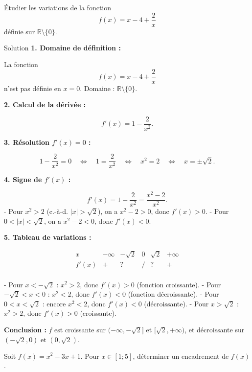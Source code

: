 \documentclass[a4paper,12pt]{article}
\begin{document}
\begin{exercice}[title=Exercice 14 $\quad \star \quad$ {[Calculer]}]
Étudier les variations de la fonction 
$$f(x) = x - 4 + \frac{2}{x}$$ 
définie sur $\mathbb{R} \setminus \{0\}$.
\end{exercice}

\begin{solutionbox}{Solution}
\textbf{1. Domaine de définition :}

La fonction 
$$f(x) = x - 4 + \frac{2}{x}$$
n’est pas définie en $x=0$.  
Domaine : $\mathbb{R}\setminus\{0\}$.

\textbf{2. Calcul de la dérivée :}

$$f'(x) = 1 - \frac{2}{x^2}.$$

\textbf{3. Résolution $f'(x) = 0$ :}

\[
1 - \frac{2}{x^2} = 0 
\quad \Longleftrightarrow \quad
1 = \frac{2}{x^2}
\quad \Longleftrightarrow \quad
x^2 = 2
\quad \Longleftrightarrow \quad
x = \pm \sqrt{2}.
\]

\textbf{4. Signe de $f'(x)$ :}

\[
f'(x) = 1 - \frac{2}{x^2} = \frac{x^2 - 2}{x^2}.
\]
- Pour $x^2 > 2$ (c.-à-d. $|x| > \sqrt{2}$), on a $x^2 - 2 > 0$, donc $f'(x) > 0$.  
- Pour $0 < |x| < \sqrt{2}$, on a $x^2 - 2 < 0$, donc $f'(x) < 0$.

\textbf{5. Tableau de variations :}

\[
\begin{array}{c|cccccc}
x & -\infty & -\sqrt{2} & 0 & \sqrt{2} & +\infty \\
\hline
f'(x) & + & ? & \text{/} & ? & + \\
\end{array}
\]

- Pour $x < -\sqrt{2}$ : $x^2 > 2$, donc $f'(x) > 0$ (fonction croissante).
- Pour $-\sqrt{2} < x < 0$ : $x^2 < 2$, donc $f'(x) < 0$ (fonction décroissante).
- Pour $0 < x < \sqrt{2}$ : encore $x^2 < 2$, donc $f'(x) < 0$ (décroissante).
- Pour $x > \sqrt{2}$ : $x^2 > 2$, donc $f'(x) > 0$ (croissante).

\textbf{Conclusion :}  
$f$ est croissante sur $(-\infty, -\sqrt{2}]$ et $[\sqrt{2}, +\infty)$, et décroissante sur $(-\sqrt{2}, 0)$ et $(0, \sqrt{2})$.
\end{solutionbox}

\begin{exercice}[title=Exercice 20 $\quad \star \star \quad$ {[Calculer]}]
Soit $f(x) = x^2 - 3x + 1$. Pour $x \in [1; 5]$, déterminer un encadrement de $f(x)$.
\end{exercice}
\end{document}
